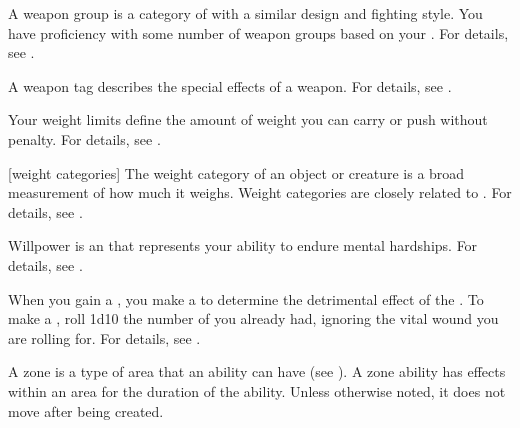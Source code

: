  A weapon group is a category of  with a similar design and fighting style.
You have proficiency with some number of weapon groups based on your .
For details, see .

 A weapon tag describes the special effects of a weapon.
For details, see .

 Your weight limits define the amount of weight you can carry or push without penalty.
For details, see .

[weight categories] The weight category of an object or creature is a broad measurement of how much it weighs.
Weight categories are closely related to .
For details, see .

 Willpower is an  that represents your ability to endure mental hardships.
For details, see .

 When you gain a , you make a  to determine the detrimental effect of the .
To make a , roll 1d10 \sub the number of  you already had, ignoring the vital wound you are rolling for.
For details, see .

 A zone is a type of area that an ability can have (see ).
A zone ability has effects within an area for the duration of the ability.
Unless otherwise noted, it does not move after being created.
